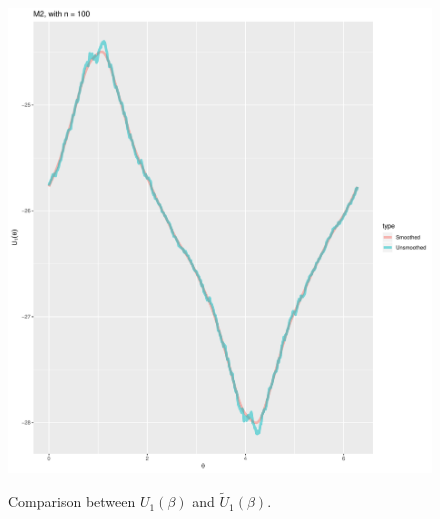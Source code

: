 \documentclass[a4paper,10pt]{article}
\begin{document}
\begin{center}
\begin{figure}
\caption{Comparison between $U_1(\beta)$ and $\tilde U_1(\beta)$.}
\includegraphics[scale = .6]{rank.pdf}\label{comp}
\end{figure}
\end{center}
\end{document}
